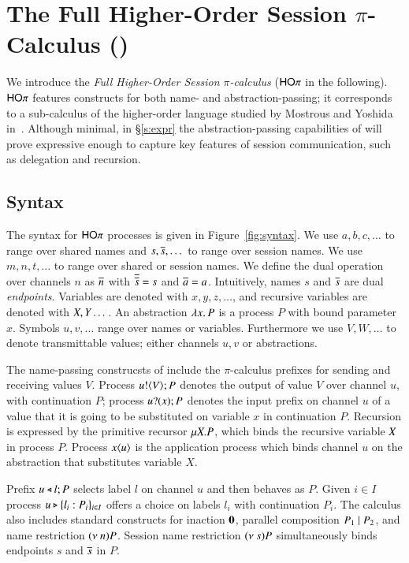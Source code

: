 
\section{The Full Higher-Order Session $\pi$-Calculus (\HOp)}

We introduce the {\em Full Higher-Order Session $\pi$-calculus}
($\mathsf{HO}\pi$ in the following).
$\mathsf{HO}\pi$ features constructs for both name- and abstraction-passing;
it corresponds to a sub-calculus 
of the higher-order language studied by Mostrous and Yoshida in~\cite{tlca07}.
Although minimal, in \S\ref{s:expr}
the abstraction-passing capabilities of \HOp will prove 
expressive enough to capture key features of session communication, 
such as delegation and recursion.

\subsection{Syntax}

The syntax for $\mathsf{HO}\pi$ processes is given in Figure~\ref{fig:syntax}.
We use $a,b,c, \dots$ to range over shared names and
$s, \overline{s}, \dots$ to range over session names.
We use $m, n, t, \dots$ to range over shared or session names.
We define the dual operation over channels $n$ as $\overline{n}$ with
$\overline{\overline{s}} = s$ and $\overline{a} = a$.
Intuitively, names $s$ and $\overline{s}$ are dual \emph{endpoints}.
Variables are denoted with $x, y, z, \dots$, 
and recursive variables are denoted with $X, Y \dots$.
An abstraction $\lambda x.\,P$ is a process $P$ with bound parameter $x$.
Symbols $u, v, \dots$ range over names or variables. Furthermore
we use $V, W, \dots$ to denote transmittable values; either channels $u, v$ or
abstractions.

The name-passing construcsts of \HOp include the
$\pi$-calculus prefixes for sending and receiving values $V$.
Process $u ! \langle V \rangle ; P$ denotes the output of value $V$
over channel $u$, with continuation $P$;
process $u ? (x) ; P$ denotes the input prefix on channel $u$ of a value
that it is going to be substituted on variable $x$ in continuation $P$. 
Recursion is expressed by the primitive recursor $\mu X. P$,
which binds the recursive variable $X$ in process $P$.
Process $x\langle u \rangle$ is the application
process which binds channel $u$ on the abstraction that
substitutes variable $X$.

Prefix $u \triangleleft l ; P$ selects label $l$ on channel $u$ and then behaves as $P$.
Given $i \in I$ process $u \triangleright \{l_i: P_i\}_{i \in I}$ offers a choice on labels $l_i$ with
continuation $P_i$.
The calculus also includes standard constructs for 
inaction $\mathbf{0}$,  parallel composition $P_1 \;|\; P_2$, and 
name restriction $(\nu\ n) P$.
Session name restriction $(\nu\ s) P$ simultaneously binds endpoints $s$ and $\overline{s}$ in $P$.

